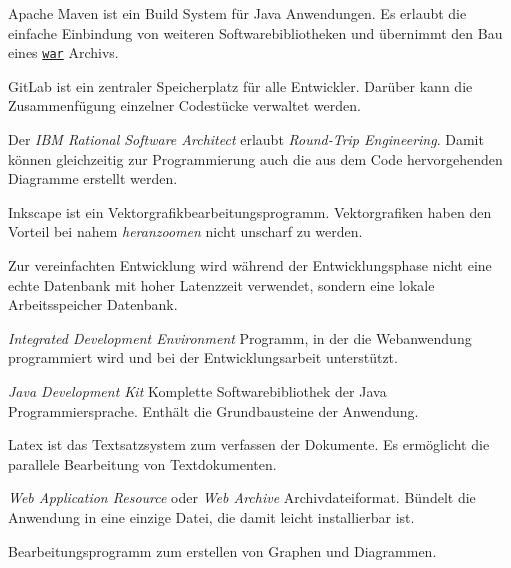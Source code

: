 
\begin{description}
	 Apache Maven ist ein Build System für Java Anwendungen. Es erlaubt die einfache Einbindung von weiteren Softwarebibliotheken und übernimmt den Bau eines \hyperref[glo:war]{\texttt{war}} Archivs.

	 GitLab ist ein zentraler Speicherplatz für alle Entwickler. Darüber kann die Zusammenfügung einzelner Codestücke verwaltet werden.

	 Der \emph{IBM Rational Software Architect} erlaubt \emph{Round-Trip Engineering}. Damit können gleichzeitig zur Programmierung auch die aus dem Code hervorgehenden Diagramme erstellt werden.

	 Inkscape ist ein Vektorgrafikbearbeitungsprogramm. Vektorgrafiken haben den Vorteil bei nahem \emph{heranzoomen} nicht unscharf zu werden.

	 Zur vereinfachten Entwicklung wird während der Entwicklungsphase nicht eine echte Datenbank mit hoher Latenzzeit verwendet, sondern eine lokale Arbeitsspeicher Datenbank.

	 \emph{Integrated Development Environment} Programm, in der die Webanwendung programmiert wird und bei der Entwicklungsarbeit unterstützt.

	 \emph{Java Development Kit} Komplette Softwarebibliothek der Java Programmiersprache. Enthält die Grundbausteine der Anwendung.

	 Latex ist das Textsatzsystem zum verfassen der Dokumente. Es ermöglicht die parallele Bearbeitung von Textdokumenten.

	 \emph{Web Application Resource} oder \emph{Web Archive} Archivdateiformat. Bündelt die Anwendung in eine einzige Datei, die damit leicht installierbar ist.

	 Bearbeitungsprogramm zum erstellen von Graphen und Diagrammen.
\end{description}
